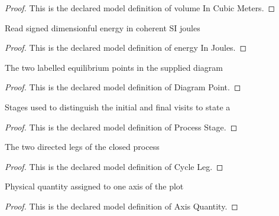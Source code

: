 \begin{proof}
  This is the declared model definition of volume In Cubic Meters.
\end{proof}
\begin{definition}
  \label{def:physics:phyx-mini-0470:phyxminiproblems-problemphyxmini0470-energyinjoules}
  Read signed dimensionful energy in coherent SI joules
\end{definition}
\begin{proof}
  This is the declared model definition of energy In Joules.
\end{proof}
\begin{definition}
  \label{def:physics:phyx-mini-0470:phyxminiproblems-problemphyxmini0470-diagrampoint}
  The two labelled equilibrium points in the supplied diagram
\end{definition}
\begin{proof}
  This is the declared model definition of Diagram Point.
\end{proof}
\begin{definition}
  \label{def:physics:phyx-mini-0470:phyxminiproblems-problemphyxmini0470-processstage}
  Stages used to distinguish the initial and final visits to state a
\end{definition}
\begin{proof}
  This is the declared model definition of Process Stage.
\end{proof}
\begin{definition}
  \label{def:physics:phyx-mini-0470:phyxminiproblems-problemphyxmini0470-cycleleg}
  The two directed legs of the closed process
\end{definition}
\begin{proof}
  This is the declared model definition of Cycle Leg.
\end{proof}
\begin{definition}
  \label{def:physics:phyx-mini-0470:phyxminiproblems-problemphyxmini0470-axisquantity}
  Physical quantity assigned to one axis of the plot
\end{definition}
\begin{proof}
  This is the declared model definition of Axis Quantity.
\end{proof}

